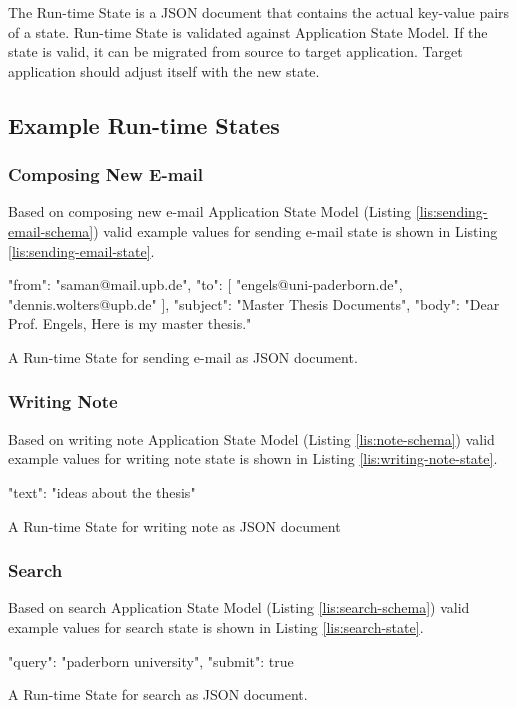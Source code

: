 The Run-time State is a JSON document that contains the actual key-value pairs of a state. Run-time State is validated against Application State Model. If the state is valid, it can be migrated from source to target application.
Target application should adjust itself with the new state.

\subsection{Example Run-time States}

\subsubsection{Composing New E-mail}
Based on composing new e-mail Application State Model (Listing \ref{lis:sending-email-schema}) valid example values for sending e-mail state is shown in Listing \ref{lis:sending-email-state}.


\FloatBarrier
\begin{code}
\begin{json}
{
  "from": "saman@mail.upb.de",
  "to": [
    "engels@uni-paderborn.de",
    "dennis.wolters@upb.de"
  ],
  "subject": "Master Thesis Documents",
  "body": "Dear Prof. Engels\n, Here is my master thesis."
}
\end{json}
\caption{A Run-time State for sending e-mail as JSON document.}
\label{lis:sending-email-state}
\end{code}
\FloatBarrier

\subsubsection{Writing Note}
Based on writing note Application State Model (Listing \ref{lis:note-schema}) valid example values for writing note state is shown in Listing \ref{lis:writing-note-state}.
 
\FloatBarrier
\begin{code}
\begin{json}
{
    "text": "ideas about the thesis"
}
\end{json}
\caption{A Run-time State for writing note as JSON document}
\label{lis:writing-note-state}
\end{code}
\FloatBarrier


\subsubsection{Search}
Based on search Application State Model (Listing \ref{lis:search-schema}) valid example values for search state is shown in Listing \ref{lis:search-state}.

\FloatBarrier
\begin{code}
\begin{json}
{
    "query": "paderborn university",
    "submit": true
}
\end{json}
\caption{A Run-time State for search as JSON document.}
\label{lis:search-state}
\end{code}
\FloatBarrier